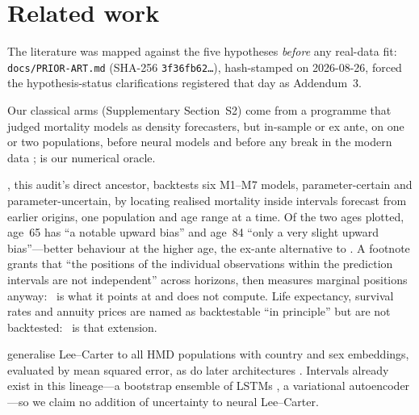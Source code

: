 \section{Related work}
\label{sec:related}

The literature was mapped against the five hypotheses \emph{before} any real-data
fit: \texttt{docs/PRIOR-ART.md} (SHA-256 \texttt{3f36fb62\ldots}), hash-stamped on
2026-08-26, forced the hypothesis-status clarifications registered that day as
Addendum~3.

Our classical arms (Supplementary Section~S2) come from a programme
\citep{lee1992modeling,girosi2007understanding,brouhns2002poisson,brouhns2005bootstrapping,li2005coherent,li2017coherent,cairns2006two,renshaw2006cohort}
that judged mortality models as density forecasters, but in-sample or ex ante, on
one or two populations, before neural models and before any break in the modern
data
\citep{cairns2009quantitative,cairns2011mortality,dowd2010evaluating,booth2008mortality};
 \citep{villegas2018stmomo} is our numerical oracle.

\citet{dowd2010backtesting}, this audit's direct ancestor, backtests six M1--M7
models, parameter-certain and parameter-uncertain, by locating realised mortality
inside intervals forecast from earlier origins, one population and age range at a
time. Of the two ages plotted, age~65 has ``a notable upward bias'' and age~84
``only a very slight upward bias''---better behaviour at the higher age, the
ex-ante alternative to \Hfour. A footnote grants that ``the positions of the
individual observations within the prediction intervals are not independent''
across horizons, then measures marginal positions anyway: \Hthree\ is what it
points at and does not compute. Life expectancy, survival rates and annuity prices
are named as backtestable ``in principle'' but are not backtested: \Hfive\ is
that extension.

\citet{richman2021neural} generalise Lee--Carter to all HMD populations with
country and sex embeddings, evaluated by mean squared error, as do later
architectures
\citep{hainaut2018neural,nigri2019deep,petnehazi2019mortality,perla2021time,scognamiglio2022calibrating}.
Intervals already exist in this lineage---a bootstrap ensemble of LSTMs
\citep{marino2023neural}, a variational autoencoder \citep{miyata2022extending}---so
we claim no addition of uncertainty to neural Lee--Carter.


